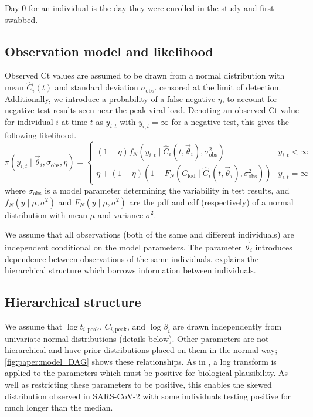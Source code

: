 \documentclass[thesis.tex]{subfiles}
\begin{document}
Day 0 for an individual is the day they were enrolled in the study and first swabbed.

\subsection{Observation model and likelihood}

Observed Ct values are assumed to be drawn from a normal distribution with mean $\hat{C}_i(t)$ and standard deviation $\sigma_\text{obs}$.
censored at the limit of detection.
Additionally, we introduce a probability of a false negative $\eta$, to account for negative test results seen near the peak viral load.
Denoting an observed Ct value for individual $i$ at time $t$ as $y_{i,t}$ with
$y_{i,t} = \infty$ for a negative test, this gives the following likelihood.
$$
\pi(y_{i,t} \mid \vec\theta_i, \sigma_\text{obs}, \eta) = \begin{cases}
  (1 - \eta) f_N(y_{i,t} \mid \hat{C}_i(t, \vec\theta_i), \sigma_\text{obs}^2) &y_{i,t} < \infty \\
  \eta + (1 - \eta) (1 - F_N(C_\text{lod} \mid \hat{C}_i(t, \vec\theta_i), \sigma_\text{obs}^2)) & y_{i,t} = \infty
\end{cases}
$$
where $\sigma_\text{obs}$ is a model parameter determining the variability in
test results, and $f_N(y \mid \mu, \sigma^2)$ and $F_N(y \mid \mu, \sigma^2)$ are the pdf
and cdf (respectively) of a normal distribution with mean $\mu$ and variance $\sigma^2$.

We assume that all observations (both of the same and different individuals) are independent conditional on the model parameters.
The parameter $\vec\theta_i$ introduces dependence between observations of the same individuals.
 explains the hierarchical structure which borrows information between individuals.

\subsection{Hierarchical structure}\label{sec:paper:hierarchy}

We assume that $\log t_{i,\text{peak}}$, $C_{i,\text{peak}}$, and $\log \beta_i$ are drawn independently from univariate normal distributions (details below).
Other parameters are not hierarchical and have prior distributions placed on them in the normal way; \cref{fig:paper:model_DAG} shows these relationships.
As in \textcite{fogartyBayesian}, a log transform is applied to the parameters which must be positive for biological plausibility.
As well as restricting these parameters to be positive, this enables the skewed distribution observed in SARS-CoV-2 with some individuals testing positive for much longer than the median.
\end{document}
